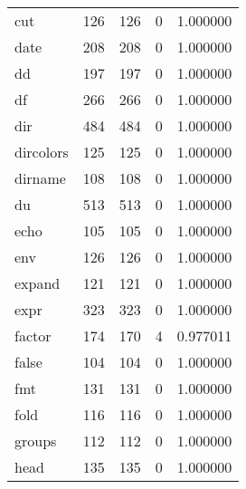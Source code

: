 \begin{tabular}{lrrrr}
cut       &                     126 &              126 &                 0 &                     1.000000 \\
date      &                     208 &              208 &                 0 &                     1.000000 \\
dd        &                     197 &              197 &                 0 &                     1.000000 \\
df        &                     266 &              266 &                 0 &                     1.000000 \\
dir       &                     484 &              484 &                 0 &                     1.000000 \\
dircolors &                     125 &              125 &                 0 &                     1.000000 \\
dirname   &                     108 &              108 &                 0 &                     1.000000 \\
du        &                     513 &              513 &                 0 &                     1.000000 \\
echo      &                     105 &              105 &                 0 &                     1.000000 \\
env       &                     126 &              126 &                 0 &                     1.000000 \\
expand    &                     121 &              121 &                 0 &                     1.000000 \\
expr      &                     323 &              323 &                 0 &                     1.000000 \\
factor    &                     174 &              170 &                 4 &                     0.977011 \\
false     &                     104 &              104 &                 0 &                     1.000000 \\
fmt       &                     131 &              131 &                 0 &                     1.000000 \\
fold      &                     116 &              116 &                 0 &                     1.000000 \\
groups    &                     112 &              112 &                 0 &                     1.000000 \\
head      &                     135 &              135 &                 0 &                     1.000000 \\

\end{tabular}
